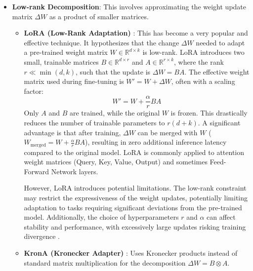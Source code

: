 \begin{itemize}
    \item \textbf{Low-rank Decomposition}: This involves approximating the weight update matrix \( \Delta W \) as a product of smaller matrices.
        \begin{itemize}
            \item \textbf{LoRA (Low-Rank Adaptation)}\label{lora_theory} \cite{hu2021lora}: This has become a very popular and effective technique. It hypothesizes that the change \( \Delta W \) needed to adapt a pre-trained weight matrix \( W \in \mathbb{R}^{d \times k} \) is low-rank. LoRA introduces two small, trainable matrices \( B \in \mathbb{R}^{d \times r} \) and \( A \in \mathbb{R}^{r \times k} \), where the rank \( r \ll \min(d, k) \), such that the update is \( \Delta W = BA \). The effective weight matrix used during fine-tuning is \( W' = W + \Delta W \), often with a scaling factor:
                  \begin{equation}
                      W' = W + \frac{\alpha}{r} BA
                      \label{eq:lora_update_peft}
                  \end{equation}
                  Only \( A \) and \( B \) are trained, while the original \( W \) is frozen. This drastically reduces the number of trainable parameters to \( r(d+k) \). A significant advantage is that after training, \( \Delta W \) can be merged with \( W \) (\( W_{\text{merged}} = W + \frac{\alpha}{r} BA \)), resulting in zero additional inference latency compared to the original model. LoRA is commonly applied to attention weight matrices (Query, Key, Value, Output) and sometimes Feed-Forward Network layers.

                  However, LoRA introduces potential limitations. The low-rank constraint may restrict the expressiveness of the weight updates, potentially limiting adaptation to tasks requiring significant deviations from the pre-trained model. Additionally, the choice of hyperparameters $r$ and $\alpha$ can affect stability and performance, with excessively large updates risking training divergence \cite{hu2021lora}.
            \item \textbf{KronA (Kronecker Adapter)} \cite{edalati2022krona}: Uses Kronecker products instead of standard matrix multiplication for the decomposition \( \Delta W = B \otimes A \).
        \end{itemize}


\end{itemize}
